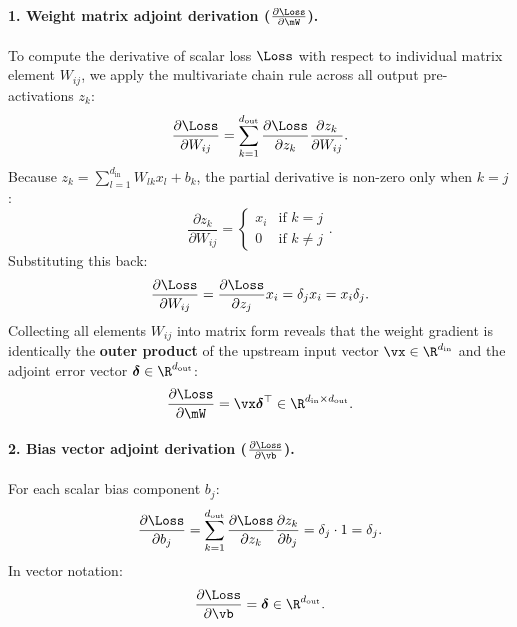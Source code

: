 \documentclass[../../main.tex]{subfiles}
\begin{document}
\paragraph{1. Weight matrix adjoint derivation ($\frac{\partial \Loss}{\partial \mW}$).}
To compute the derivative of scalar loss $\Loss$ with respect to individual matrix element $W_{ij}$, we apply the multivariate chain rule across all output pre-activations $z_k$:
\begin{equation}
\frac{\partial \Loss}{\partial W_{ij}} = \sum_{k=1}^{d_{\text{out}}} \frac{\partial \Loss}{\partial z_k} \frac{\partial z_k}{\partial W_{ij}}.
\end{equation}
Because $z_k = \sum_{l=1}^{d_{\text{in}}} W_{lk} x_l + b_k$, the partial derivative is non-zero only when $k = j$:
\begin{equation}
\frac{\partial z_k}{\partial W_{ij}} = \begin{cases} x_i & \text{if } k = j \\ 0 & \text{if } k \ne j \end{cases}.
\end{equation}
Substituting this back:
\begin{equation}
\frac{\partial \Loss}{\partial W_{ij}} = \frac{\partial \Loss}{\partial z_j} x_i = \delta_j x_i = x_i \delta_j.
\end{equation}
Collecting all elements $W_{ij}$ into matrix form reveals that the weight gradient is identically the \textbf{outer product} of the upstream input vector $\vx \in \R^{d_{\text{in}}}$ and the adjoint error vector $\bm{\delta} \in \R^{d_{\text{out}}}$:
\begin{equation}
\label{eq:weight_matrix_gradient}
\frac{\partial \Loss}{\partial \mW} = \vx \bm{\delta}^\top \in \R^{d_{\text{in}} \times d_{\text{out}}}.
\end{equation}

\paragraph{2. Bias vector adjoint derivation ($\frac{\partial \Loss}{\partial \vb}$).}
For each scalar bias component $b_j$:
\begin{equation}
\frac{\partial \Loss}{\partial b_j} = \sum_{k=1}^{d_{\text{out}}} \frac{\partial \Loss}{\partial z_k} \frac{\partial z_k}{\partial b_j} = \delta_j \cdot 1 = \delta_j.
\end{equation}
In vector notation:
\begin{equation}
\label{eq:bias_vector_gradient}
\frac{\partial \Loss}{\partial \vb} = \bm{\delta} \in \R^{d_{\text{out}}}.
\end{equation}
\end{document}
